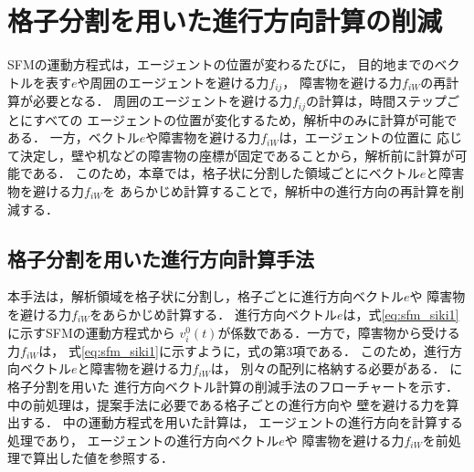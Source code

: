 \chapter{格子分割を用いた進行方向計算の削減}
\label{sec:reduce_travel_direction}
SFMの運動方程式は，エージェントの位置が変わるたびに，
目的地までのベクトルを表す$e$や周囲のエージェントを避ける力$f_{ij}$，
障害物を避ける力$f_{iW}$の再計算が必要となる．
周囲のエージェントを避ける力$f_{ij}$の計算は，時間ステップごとにすべての
エージェントの位置が変化するため，解析中のみに計算が可能である．
一方，ベクトル$e$や障害物を避ける力$f_{iW}$は，エージェントの位置に
応じて決定し，壁や机などの障害物の座標が固定であることから，解析前に計算が可能である．
このため，本章では，格子状に分割した領域ごとにベクトル$e$と障害物を避ける力$f_{iW}$を
あらかじめ計算することで，解析中の進行方向の再計算を削減する．

\section{格子分割を用いた進行方向計算手法}
本手法は，解析領域を格子状に分割し，格子ごとに進行方向ベクトル$e$や
障害物を避ける力$f_{iW}$をあらかじめ計算する．
進行方向ベクトル$e$は，式\eqref{eq:sfm_siki1}に示すSFMの運動方程式から
$v_i^0(t)$が係数である．一方で，障害物から受ける力$f_{iW}$は，
式\eqref{eq:sfm_siki1}に示すように，式の第3項である．
このため，進行方向ベクトル$e$と障害物を避ける力$f_{iW}$は，
別々の配列に格納する必要がある．
に格子分割を用いた
進行方向ベクトル計算の削減手法のフローチャートを示す．
中の前処理は，提案手法に必要である格子ごとの進行方向や
壁を避ける力を算出する．
中の運動方程式を用いた計算は，
エージェントの進行方向を計算する処理であり，
エージェントの進行方向ベクトル$e$や
障害物を避ける力$f_{iW}$を前処理で算出した値を参照する．


